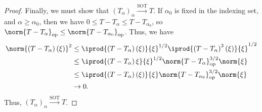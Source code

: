 \documentclass[10pt]{mypackage}
\begin{document}
\begin{proof}
  Finally, we must show that $\left(T_{\alpha}\right)_{\alpha}\xrightarrow{\text{SOT}}T$. If $\alpha_0$ is fixed in the indexing set, and $\alpha \geq \alpha_0$, then we have $0 \leq T - T_{\alpha}\leq T - T_{\alpha_0}$, so $\norm{T - T_{\alpha}}_{\text{op}}\leq \norm{T - T_{\alpha_0}}_{\text{op}}$. Thus, we have
  \begin{align*}
    \norm{\left(T - T_{\alpha}\right)\left(\xi\right)}^2 &\leq \iprod{\left(T - T_{\alpha}\right)\left(\xi\right)}{\xi}^{1/2} \iprod{\left(T - T_{\alpha}\right)^3\left(\xi\right)}{\xi}^{1/2}\\
                                                         &\leq \iprod{\left(T - T_{\alpha}\right)\xi}{\xi}^{1/2}\norm{T - T_{\alpha}}_{\text{op}}^{3/2}\norm{\xi}\\
                                                         &\leq \iprod{\left(T-T_{\alpha}\right)\left(\xi\right)}{\xi} \norm{T - T_{\alpha_0}}_{\text{op}}^{3/2}\norm{\xi}\\
                                                         &\rightarrow 0.
  \end{align*}
  Thus, $\left(T_{\alpha}\right)_{\alpha}\xrightarrow{\text{SOT}}T$.
\end{proof}
\end{document}
